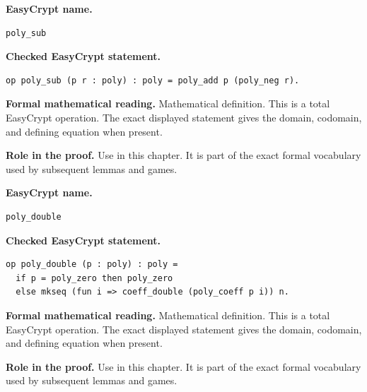 \begin{formaldefinition}
\noindent\textbf{EasyCrypt name.}
\begin{lstlisting}[language=EasyCrypt,basicstyle=\ttfamily\scriptsize]
poly_sub
\end{lstlisting}
\noindent\textbf{Checked EasyCrypt statement.}
\begin{lstlisting}[language=EasyCrypt,basicstyle=\ttfamily\scriptsize]
op poly_sub (p r : poly) : poly = poly_add p (poly_neg r).
\end{lstlisting}
\noindent\textbf{Formal mathematical reading.}
Mathematical definition. This is a total EasyCrypt operation.  The exact displayed statement gives the domain, codomain, and defining equation when present.

\noindent\textbf{Role in the proof.}
Use in this chapter. It is part of the exact formal vocabulary used by subsequent lemmas and games.

\end{formaldefinition}

\begin{formaldefinition}
\noindent\textbf{EasyCrypt name.}
\begin{lstlisting}[language=EasyCrypt,basicstyle=\ttfamily\scriptsize]
poly_double
\end{lstlisting}
\noindent\textbf{Checked EasyCrypt statement.}
\begin{lstlisting}[language=EasyCrypt,basicstyle=\ttfamily\scriptsize]
op poly_double (p : poly) : poly =
  if p = poly_zero then poly_zero
  else mkseq (fun i => coeff_double (poly_coeff p i)) n.
\end{lstlisting}
\noindent\textbf{Formal mathematical reading.}
Mathematical definition. This is a total EasyCrypt operation.  The exact displayed statement gives the domain, codomain, and defining equation when present.

\noindent\textbf{Role in the proof.}
Use in this chapter. It is part of the exact formal vocabulary used by subsequent lemmas and games.

\end{formaldefinition}

